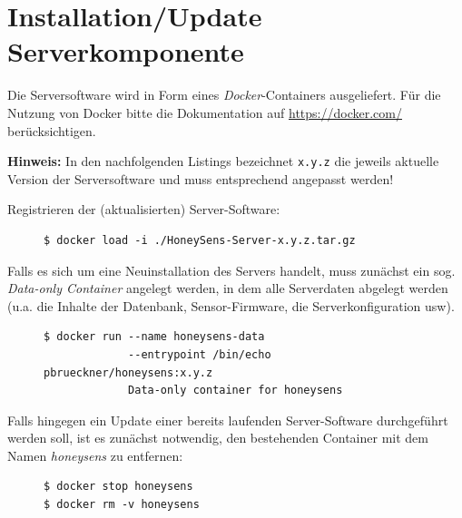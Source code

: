 \documentclass[12pt]{article}
\begin{document}
\tableofcontents

\newpage
{}

\section{Installation/Update Serverkomponente}
Die Serversoftware wird in Form eines \textit{Docker}-Containers ausgeliefert. Für die Nutzung von Docker bitte die Dokumentation auf \url{https://docker.com/} berücksichtigen.

\textbf{Hinweis:} In den nachfolgenden Listings bezeichnet \verb|x.y.z| die jeweils aktuelle Version der Serversoftware und muss entsprechend angepasst werden!

Registrieren der (aktualisierten) Server-Software:\\
\begin{figure}[h]
	\begin{lstlisting}
$ docker load -i ./HoneySens-Server-x.y.z.tar.gz
	\end{lstlisting}
\end{figure}

Falls es sich um eine Neuinstallation des Servers handelt, muss zunächst ein sog. \textit{Data-only Container} angelegt werden, in dem alle Serverdaten abgelegt werden (u.a. die Inhalte der Datenbank, Sensor-Firmware, die Serverkonfiguration usw).\\
\begin{figure}[h]
	\begin{lstlisting}
$ docker run --name honeysens-data 
             --entrypoint /bin/echo pbrueckner/honeysens:x.y.z 
             Data-only container for honeysens
	\end{lstlisting}
\end{figure}

Falls hingegen ein Update einer bereits laufenden Server-Software durchgeführt werden soll, ist es zunächst notwendig, den bestehenden Container mit dem Namen \textit{honeysens} zu entfernen:
\begin{figure}[h]
	\begin{lstlisting}
$ docker stop honeysens
$ docker rm -v honeysens
	\end{lstlisting}
\end{figure}
\end{document}
